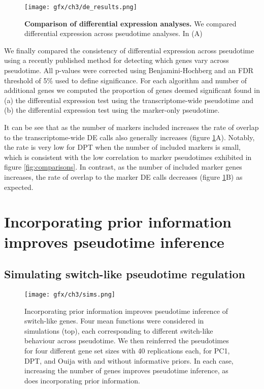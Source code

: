 \begin{figure}%
	\centering
	\texttt{[image: gfx/ch3/de\_results.png]}
	\caption{\textbf{Comparison of differential expression analyses.} We compared differential expression across pseudotime analyses. In (A)  }
	\label{fig:de_results}
\end{figure}

We finally compared the consistency of differential expression across pseudotime using a recently published method for detecting which genes vary across pseudotime. All p-values were corrected using Benjamini-Hochberg and an FDR threshold of 5\% used to define significance. For each algorithm and number of additional genes we computed the proportion of genes deemed significant found in (a) the differential expression test using the transcriptome-wide pseudotime and (b) the differential expression test using the marker-only pseudotime.

It can be see that as the number of markers included increases the rate of overlap to the transcriptome-wide DE calls also generally increases (figure \ref{fig:de_results}A). Notably, the rate is very low for DPT when the number of included markers is small, which is consistent with the low correlation to marker pseudotimes exhibited in figure \ref{fig:comparisons}. In contrast, as the number of included marker genes increases, the rate of overlap to the marker DE calls decreases (figure \ref{fig:de_results}B) as expected. 

\section{Incorporating prior information improves pseudotime inference}

\subsection{Simulating switch-like pseudotime regulation}

\begin{figure}%
	\centering
	\texttt{[image: gfx/ch3/sims.png]}
	\caption{Incorporating prior information improves pseudotime inference of switch-like genes. Four mean functions were considered in simulations (top), each corresponding to different switch-like behaviour across pseudotime. We then reinferred the pseudotimes for four different gene set sizes with 40 replications each, for PC1, DPT, and Ouija with and without informative priors. In each case, increasing the number of genes improves pseudotime inference, as does incorporating prior information.}
	\label{fig:simulated_comparison}
\end{figure}

